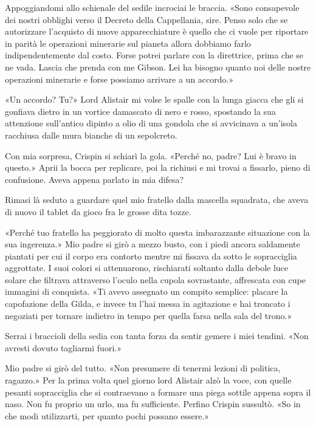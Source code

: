 Appoggiandomi allo schienale del sedile incrociai le braccia. «Sono
consapevole dei nostri obblighi verso il Decreto della Cappellania,
sire. Penso solo che se autorizzare l'acquisto di nuove apparecchiature
è quello che ci vuole per riportare in parità le operazioni minerarie
sul pianeta allora dobbiamo farlo indipendentemente dal costo. Forse
potrei parlare con la direttrice, prima che se ne vada. Lascia che
prenda con me Gibson. Lei ha bisogno quanto noi delle nostre operazioni
minerarie e forse possiamo arrivare a un accordo.»

«Un accordo? Tu?» Lord Alistair mi volse le spalle con la lunga giacca
che gli si gonfiava dietro in un vortice damascato di nero e rosso,
spostando la sua attenzione sull'antico dipinto a olio di una gondola
che si avvicinava a un'isola racchiusa dalle mura bianche di un
sepolcreto.

Con mia sorpresa, Crispin si schiarì la gola. «Perché no, padre? Lui è
bravo in questo.» Aprii la bocca per replicare, poi la richiusi e mi
trovai a fissarlo, pieno di confusione. Aveva appena parlato in mia
difesa?

Rimasi là seduto a guardare quel mio fratello dalla mascella squadrata,
che aveva di nuovo il tablet da gioco fra le grosse dita tozze.

«Perché tuo fratello ha peggiorato di molto questa imbarazzante
situazione con la sua ingerenza.» Mio padre si girò a mezzo busto, con i
piedi ancora saldamente piantati per cui il corpo era contorto mentre mi
fissava da sotto le sopracciglia aggrottate. I suoi colori si
attenuarono, rischiarati soltanto dalla debole luce solare che filtrava
attraverso l'oculo nella cupola sovrastante, affrescata con cupe
immagini di conquista. «Ti avevo assegnato un compito semplice: placare
la capofazione della Gilda, e invece tu l'hai messa in agitazione e hai
troncato i negoziati per tornare indietro in tempo per quella farsa
nella sala del trono.»

Serrai i braccioli della sedia con tanta forza da sentir gemere i miei
tendini. «Non avresti dovuto tagliarmi fuori.»

Mio padre si girò del tutto. «Non presumere di tenermi lezioni di
politica, ragazzo.» Per la prima volta quel giorno lord Alistair alzò la
voce, con quelle pesanti sopracciglia che si contraevano a formare una
piega sottile appena sopra il naso. Non fu proprio un urlo, ma fu
sufficiente. Perfino Crispin sussultò. «So in che modi utilizzarti, per
quanto pochi possano essere.»

